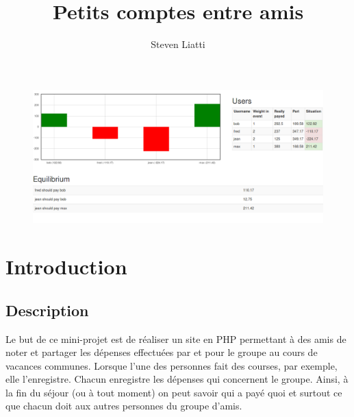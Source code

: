 \documentclass[a4paper, 12pt]{article}
\begin{document}
\title{Petits comptes entre amis} 
\author{Steven Liatti} 
\maketitle

\begin{figure}
	\begin{center}
		\includegraphics[width=1.0\textwidth]{intro.png}
	\end{center}
\end{figure}
\newpage

\tableofcontents
\listoffigures
\renewcommand\listoflistingscaption{Table des listings de code source}
\listoflistings

\newpage

\section{Introduction}
\subsection{Description}
Le but de ce mini-projet est de réaliser un site en PHP permettant à des amis de noter et
partager les dépenses effectuées par et pour le groupe au cours de vacances
communes. Lorsque l'une des personnes fait des courses, par exemple, elle l'enregistre.
Chacun enregistre les dépenses qui concernent le groupe. Ainsi, à la fin du séjour (ou à
tout moment) on peut savoir qui a payé quoi et surtout ce que chacun doit aux autres
personnes du groupe d'amis.
\end{document}
